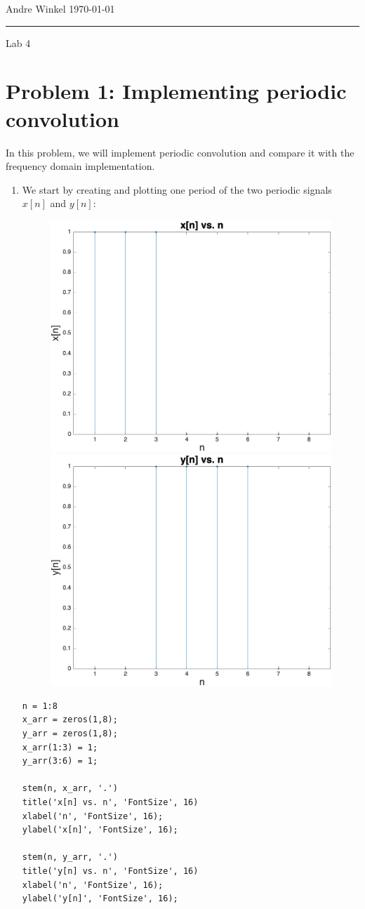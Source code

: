 \documentclass[12pt]{article}
\begin{document}
\noindent Andre Winkel \hfill \today \\
\rule{\textwidth}{0.4pt} \vspace{0em}
\begin{center} \large{Lab 4} \end{center} \vspace*{0em}

\section*{Problem 1: Implementing periodic convolution}
In this problem, we will implement periodic convolution and compare it with the frequency domain implementation.
\begin{enumerate}[label=\textbf{\alph*)}, leftmargin=2.6em]

\item We start by creating and plotting one period of the two periodic signals $x[n]$ and $y[n]$:
\begin{figure}[H]
    \centering
    \includegraphics[width=0.35\linewidth]{1.png}
    \includegraphics[width=0.35\linewidth]{2.png}
\end{figure}
\begin{verbatim}
n = 1:8
x_arr = zeros(1,8);
y_arr = zeros(1,8);
x_arr(1:3) = 1;
y_arr(3:6) = 1;

stem(n, x_arr, '.')
title('x[n] vs. n', 'FontSize', 16)
xlabel('n', 'FontSize', 16);
ylabel('x[n]', 'FontSize', 16);

stem(n, y_arr, '.')
title('y[n] vs. n', 'FontSize', 16)
xlabel('n', 'FontSize', 16);
ylabel('y[n]', 'FontSize', 16);
\end{verbatim}


\end{enumerate}
\end{document}
